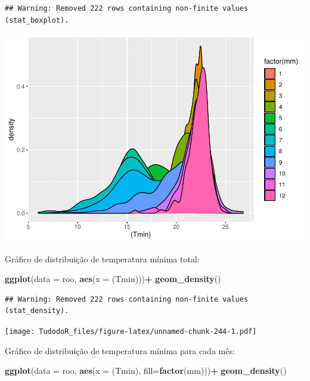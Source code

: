 \documentclass[
]{book}
\newenvironment{Shaded}{\begin{snugshade}}{\end{snugshade}}
\newcommand{\DataTypeTok}[1]{\textcolor[rgb]{0.13,0.29,0.53}{#1}}
\newcommand{\KeywordTok}[1]{\textcolor[rgb]{0.13,0.29,0.53}{\textbf{#1}}}
\newcommand{\NormalTok}[1]{#1}
\newcommand{\OperatorTok}[1]{\textcolor[rgb]{0.81,0.36,0.00}{\textbf{#1}}}
\newcommand{\StringTok}[1]{\textcolor[rgb]{0.31,0.60,0.02}{#1}}
\begin{document}
\begin{verbatim}
## Warning: Removed 222 rows containing non-finite values (stat_boxplot).
\end{verbatim}

\includegraphics{TudodoR_files/figure-latex/unnamed-chunk-243-1.pdf}

Gráfico de distribuição de temperatura mínima total:

\begin{Shaded}
\begin{Highlighting}[]
\KeywordTok{ggplot}\NormalTok{(}\DataTypeTok{data =}\NormalTok{ roo, }\KeywordTok{aes}\NormalTok{(}\DataTypeTok{x =}\NormalTok{ (Tmin)))}\OperatorTok{+}
\StringTok{  }\KeywordTok{geom_density}\NormalTok{()}
\end{Highlighting}
\end{Shaded}

\begin{verbatim}
## Warning: Removed 222 rows containing non-finite values (stat_density).
\end{verbatim}

\texttt{[image: TudodoR\_files/figure-latex/unnamed-chunk-244-1.pdf]}

Gráfico de distribuição de temperatura mínima para cada mês:

\begin{Shaded}
\begin{Highlighting}[]
\KeywordTok{ggplot}\NormalTok{(}\DataTypeTok{data =}\NormalTok{ roo, }\KeywordTok{aes}\NormalTok{(}\DataTypeTok{x =}\NormalTok{ (Tmin), }\DataTypeTok{fill=}\KeywordTok{factor}\NormalTok{(mm)))}\OperatorTok{+}
\StringTok{  }\KeywordTok{geom_density}\NormalTok{() }
\end{Highlighting}
\end{Shaded}
\end{document}
